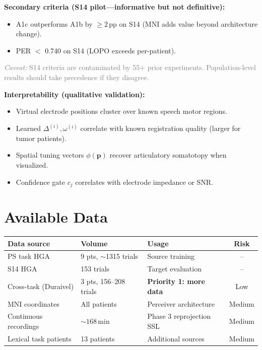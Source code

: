 \documentclass[11pt,letterpaper]{article}
\newcommand{\caveat}[1]{\par\smallskip\noindent\textcolor{gray}{\textit{Caveat:} #1}\smallskip}
\newcommand{\pp}{\,\text{pp}}
\newcommand{\bfp}{\mathbf{p}}
\begin{document}
\textbf{Secondary criteria (S14 pilot---informative but not definitive):}
\begin{itemize}[leftmargin=2em]
\item A1c outperforms A1b by ${\geq}2\pp$ on S14 (MNI adds value beyond architecture change).
\item PER ${<}$ 0.740 on S14 (LOPO exceeds per-patient).
\end{itemize}

\caveat{S14 criteria are contaminated by 55+ prior experiments. Population-level results should take precedence if they disagree.}

\textbf{Interpretability (qualitative validation):}
\begin{itemize}[leftmargin=2em]
\item Virtual electrode positions cluster over known speech motor regions.
\item Learned $\Delta^{(i)}, \omega^{(i)}$ correlate with known registration quality (larger for tumor patients).
\item Spatial tuning vectors $\phi(\bfp)$ recover articulatory somatotopy when visualized.
\item Confidence gate $c_j$ correlates with electrode impedance or SNR.
\end{itemize}


\section{Available Data}

\begin{table}[h]\centering\small
\begin{tabular}{@{}lllc@{}}
\toprule
\textbf{Data source} & \textbf{Volume} & \textbf{Usage} & \textbf{Risk} \\
\midrule
PS task HGA & 9 pts, ${\sim}$1315 trials & Source training & -- \\
S14 HGA & 153 trials & Target evaluation & -- \\
Cross-task (Duraivel) & 3 pts, 156--208 trials & \textbf{Priority 1: more data} & Low \\
MNI coordinates & All patients & Perceiver architecture & Medium \\
Continuous recordings & ${\sim}168$\,min & Phase 3 reprojection SSL & Medium \\
Lexical task patients & 13 patients & Additional sources & Medium \\
\bottomrule
\end{tabular}
\end{table}
\end{document}
